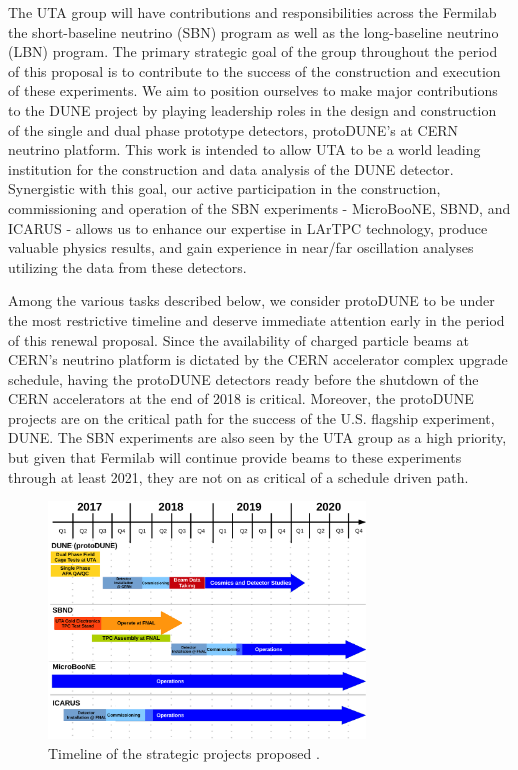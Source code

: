 The UTA group will have contributions and responsibilities across the Fermilab the short-baseline neutrino (SBN) program as well as the long-baseline neutrino (LBN) program. The primary strategic goal of the group throughout the period of this proposal is to contribute to the success of the construction and execution of these experiments. We aim to position ourselves to make major contributions to the DUNE project by playing leadership roles in the design and construction of the single and dual phase prototype detectors, protoDUNE's at CERN neutrino platform. This work is intended to allow UTA to be a world leading institution for the construction and data analysis of the DUNE detector. Synergistic with this goal, our active participation in the construction, commissioning and operation of the SBN experiments - MicroBooNE, SBND, and ICARUS - allows us to enhance our expertise in LArTPC technology, produce valuable physics results, and gain experience in near/far oscillation analyses utilizing the data from these detectors.

Among the various tasks described below, we consider protoDUNE to be under the most restrictive timeline and deserve immediate attention early in the period of this renewal proposal. Since the availability of charged particle beams at CERN's neutrino platform is dictated by the CERN accelerator complex upgrade schedule, having the protoDUNE detectors ready before the shutdown of the CERN accelerators at the end of 2018 is critical. Moreover, the protoDUNE projects are on the critical path for the success of the U.S. flagship experiment, DUNE. The SBN experiments are also seen by the UTA group as a high priority, but given that Fermilab will continue provide beams to these experiments through at least 2021, they are not on as critical of a schedule driven path.

\begin{figure}[htb]
\centering
\includegraphics[width=0.75\textwidth]{images/Timeline.pdf}
\caption[]{Timeline of the strategic projects proposed .}
\label{fig:IFTimeline}
\end{figure}


